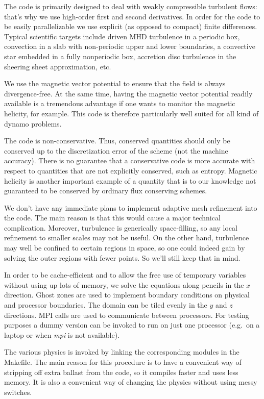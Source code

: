 \documentclass[12pt,twoside,notitlepage,a4paper]{article}
\makeatletter
\newcommand{\var}[1]{\textsl{#1}\index{#1@\emph{#1}}\/}
\makeatother
\begin{document}
The code is primarily designed to deal with weakly compressible turbulent
flows: that's why we use high-order first and second derivatives.
In order for the code to be easily parallelizable we use explicit
(as opposed to compact) finite differences.
Typical scientific targets include driven MHD turbulence in a periodic box,
convection in a slab with non-periodic upper and lower boundaries,
a convective star embedded in a fully nonperiodic box, accretion disc turbulence in
the sheering sheet approximation, etc.

We use the magnetic vector potential to ensure that the field
is always divergence-free. At the same time, having the magnetic
vector potential readily available is a tremendous advantage if
one wants to monitor the magnetic helicity, for example.
This code is therefore particularly well suited for all kind of
dynamo problems.

The code is non-conservative. Thus, conserved quantities should only be
conserved up to the discretization error of the scheme (not the machine accuracy).
There is no guarantee that a conservative code is more accurate with
respect to quantities that are not explicitly conserved, such as entropy.
Magnetic helicity is another important example of a quantity that is to
our knowledge not guaranteed to be conserved by ordinary flux conserving
schemes.

We don't have any immediate plans to implement adaptive mesh refinement
into the code. The main reason is that this would cause a major technical
complication. Moreover, turbulence is generically space-filling, so any
local refinement to smaller scales may not be useful. On the other hand,
turbulence may well be confined to certain regions in space, so one
could indeed gain by solving the outer regions with fewer points.
So we'll still keep that in mind.

In order to be cache-efficient and to allow the free use of temporary
variables without using up lots of memory, we solve the equations along
pencils in the $x$ direction. Ghost zones are used to implement boundary
conditions on physical and processor boundaries. The domain can be tiled
evenly in the $y$ and $z$ directions. MPI calls are used to communicate
between processors. For testing purposes a dummy version can be invoked
to run on just one processor (e.g.\ on a laptop or when \var{mpi}
is not available).

The various physics is invoked by linking the corresponding modules in the
Makefile. The main reason for this procedure is to have a convenient way
of stripping off extra ballast from the code, so it compiles faster and
uses less memory. It is also a convenient way of changing the physics
without using messy switches.
\end{document}
